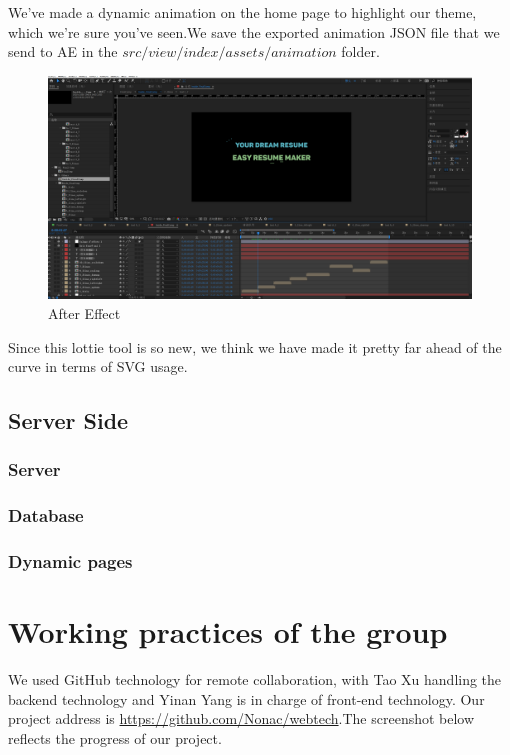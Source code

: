 \documentclass[11pt]{article}
\begin{document}
\begin{spacing}{1.0}
\begin{itemize}
We've made a dynamic animation on the home page to highlight our theme, which we're sure you've seen.We save the exported animation JSON file that we send to AE in the $src/view/index/assets/animation$ folder.
\begin{figure}[H]
	\centering
	\includegraphics[scale=0.2]{figures/ae.png}
	\caption{After Effect}
	\label{fig:6}
\end{figure}
Since this lottie tool is so new, we think we have made it pretty far ahead of the curve in terms of SVG usage.

	\end{itemize}
	\subsection{Server Side}
	\subsubsection{Server}
	\subsubsection{Database}
	\subsubsection{Dynamic pages}
	
	\section{Working practices of the group}
	We used GitHub technology for remote collaboration, with Tao Xu handling the backend technology and Yinan Yang is in charge of front-end technology. Our project address is \href{https://github.com/Nonac/webtech}{https://github.com/Nonac/webtech}.The screenshot below reflects the progress of our project.
	

\end{spacing}
\end{document}
